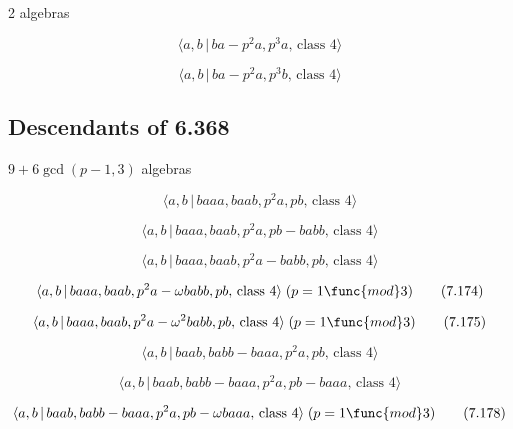 \documentclass[10pt]{article}
\begin{document}
2 algebras

\begin{equation}
\langle a,b\,|\,ba-p^2a,p^3a,\,\text{class }4\rangle  \tag{7.169}
\end{equation}

\begin{equation}
\langle a,b\,|\,ba-p^2a,p^3b,\,\text{class }4\rangle  \tag{7.170}
\end{equation}

\subsection{Descendants of 6.368}

$9+6\gcd (p-1,3)$ algebras

\begin{equation}
\langle a,b\,|\,baaa,baab,p^2a,pb,\,\text{class }4\rangle  \tag{7.171}
\end{equation}

\begin{equation}
\langle a,b\,|\,baaa,baab,p^2a,pb-babb,\,\text{class }4\rangle  \tag{7.172}
\end{equation}

\begin{equation}
\langle a,b\,|\,baaa,baab,p^2a-babb,pb,\,\text{class }4\rangle  \tag{7.173}
\end{equation}

\begin{equation}
\langle a,b\,|\,baaa,baab,p^{2}a-\omega babb,pb,\,\text{class }4\rangle
\;(p=1\func{mod}3)  \tag{7.174}
\end{equation}

\begin{equation}
\langle a,b\,|\,baaa,baab,p^{2}a-\omega ^{2}babb,pb,\,\text{class }4\rangle
\;(p=1\func{mod}3)  \tag{7.175}
\end{equation}

\begin{equation}
\langle a,b\,|\,baab,babb-baaa,p^2a,pb,\,\text{class }4\rangle  \tag{7.176}
\end{equation}

\begin{equation}
\langle a,b\,|\,baab,babb-baaa,p^2a,pb-baaa,\,\text{class }4\rangle 
\tag{7.177}
\end{equation}

\begin{equation}
\langle a,b\,|\,baab,babb-baaa,p^{2}a,pb-\omega baaa,\,\text{class }4\rangle
\;(p=1\func{mod}3)  \tag{7.178}
\end{equation}
\end{document}
